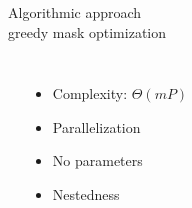 \begin{frame}{Algorithmic approach\\[-3mm] {\normalsize greedy mask optimization}}
\begin{columns}[T]
\vspace{-1.5mm}
\begin{animateinline}{2} %
\end{animateinline}
\vspace{3mm}
\begin{itemize}
\item Complexity: $\Theta(mP)$ 
\item Parallelization
\item No parameters
\item  Nestedness
\end{itemize}
\end{columns}	

\end{frame}


